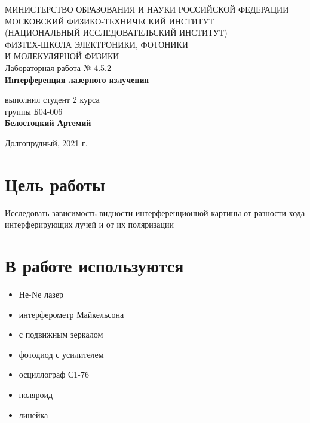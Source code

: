 \documentclass[a4paper,12pt]{article}
\begin{document}
 

\begin{titlepage}
	\begin{center}
		\large 	МИНИСТЕРСТВО ОБРАЗОВАНИЯ И НАУКИ РОССИЙСКОЙ ФЕДЕРАЦИИ\\
				МОСКОВСКИЙ ФИЗИКО-ТЕХНИЧЕСКИЙ ИНСТИТУТ \\
				(НАЦИОНАЛЬНЫЙ ИССЛЕДОВАТЕЛЬСКИЙ ИНСТИТУТ)\\ 
				ФИЗТЕХ-ШКОЛА ЭЛЕКТРОНИКИ, ФОТОНИКИ \\
				И МОЛЕКУЛЯРНОЙ ФИЗИКИ \\
		
		
		\vspace{4.0 cm}
		Лабораторная работа № 4.5.2 \\ 
		\LARGE \textbf{Интерференция лазерного излучения}
	\end{center}
	\vspace{3 cm} \large
	
	\begin{flushright}
		выполнил студент 2 курса \\
		{группы Б04-006}\\
		\textbf{Белостоцкий Артемий}\\
	\end{flushright}
	
	\vfill

	\begin{center}
	Долгопрудный, 2021 г.
	\end{center}
\end{titlepage}                                                                      

\section*{Цель работы}
Исследовать зависимость видности интерференционной картины от разности хода интерферирующих лучей и от их поляризации

\section*{В работе используются}
\begin{itemize}
\item Не-Nе лазер
\item интерферометр Майкельсона
\item с подвижным зеркалом 
\item фотодиод с усилителем 
\item осциллограф С1-76
\item поляроид
\item линейка
\end{itemize}
\end{document}
